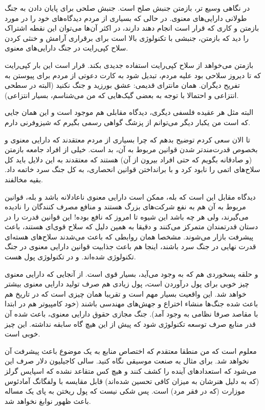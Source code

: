 در نگاهی وسیع تر، بازمتن جنبش صلح است. جنبش صلحی برای پایان دادن به
جنگ طولانی دارایی‌های معنوی. در حالی که بسیاری از مردم دیدگاه‌های خود را
در مورد بازمتن و کاری که قرار است انجام دهند دارند، در اکثر آن‌ها
می‌توان این نقطه اشتراک را دید که بازمتن، جنبشی با تکنولوژی بالا است
برای برقراری آرامش و خنثی کردن سلاح کپی‌رایت در جنگ دارایی‌های معنوی.

بازمتن می‌خواهد از سلاح کپی‌رایت استفاده جدیدی بکند. قرار است این بار
کپی‌رایت که تا دیروز سلاحی بود علیه مردم، تبدیل شود به کارت دعوتی از
مردم برای پیوستن به تفریح دیگران. همان مانترای قدیمی: عشق بورزید و جنگ نکنید (البته در
سطحی انتزاعی و احتمالا با توجه به بعضی گیک‌هایی که من می‌شناسم، بسیار
انتزاعی).

البته مثل هر عقیده فلسفی دیگری، دیدگاه مقابلی هم موجود است و این همان
جایی که است من یکبار دیگر می‌توانم از پزشگ گواهی رسمی بگیرم که شیزوفرنی
دارم.

تا الان سعی کردم توضیح بدهم که چرا بسیاری از مردم معتقدند که دارایی
معنوی و بخصوص قدرت‌مندتر شدن قوانین مربوط به آن، بد است. خیلی از افراد
جامعه بازمتن (و صادقانه بگویم که حتی افراد بیرون از آن) هستند که
معتقدند به این دلایل باید کل سلاح‌های اتمی را نابود کرد و با برانداختن
قوانین انحصاری، به کل جنگ سرد خاتمه داد. بقیه مخالفند.

دیدگاه مقابل این است که بله، ممکن است دارایی معنوی ناعادلانه باشد و
بله، قوانین مربوط به آن هم به نفع شرکت‌های بزرگ هستند و منافع مصرف
کنندگان را نادیده می‌گیرند، ولی هر چه باشد این شیوه تا امروز که نافع
بوده! این قوانین قدرت را در دستان قدرتمندان متمرکز می‌کنند و دقیقا به
همین دلیل که سلاح قوی‌ای هستند، باعث پیشرفت بازار می‌شوند. مشخصا همان
روابطی که باعث می‌شدند سلاح‌های هسته‌ای قدرت نهایی در جنگ سرد باشند،
اینجا هم باعث جذابیت قوانین دارایی‌ معنوی در جنگ تکنولوژی شده‌اند. و در
تکنولوژی پول هست.

 و حلقه پسخوردی هم که به وجود می‌آید، بسیار قوی است. از آنجایی که
 دارایی معنوی چیز خوبی برای پول درآوردن است، پول زیادی هم صرف تولید
 دارایی معنوی بیشتر خواهد شد. این واقعیت بسیار مهم است و تقریبا همان
 چیزی است که در تاریخ هم باعث شده جنگ‌ها منشاء اختراع و جهش‌های مهندسی
 باشند (خود کامپیوتر هم در ابتدا با مقاصد صرفا نظامی به وجود آمد). جنگ
 مجازی حقوق دارایی‌ معنوی، باعث شده آن قدر منابع صرف توسعه تکنولوژی شود
 که پیش از این هیچ گاه سابقه نداشته. این چیز خوبی است.

معلوم است که من منطقا معتقدم که اختصاص منابع به یک موضوع باعث پیشرفت
آن نخواهد شد. برای مثال به صنعت موسیقی نگاه کنید. سالی کاجیلیون دلار
صرف این می‌شود که استعدادهای آینده را کشف کنند و هیچ کس متقاعد نشده که
اسپایس گرلز (که به دلیل هنرشان به میزان کافی تحسین شده‌اند) قابل مقایسه
با ولفگانگ آمادئوس موزارت (که در فقر مرد) است. پس شکی نیست که پول ریختن
به پای یک مساله باعث ظهور نوابغ نخواهد شد.

